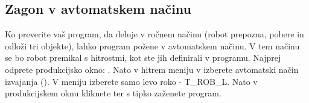 \subsection{Zagon v avtomatskem načinu}

Ko preverite vaš program, da deluje v ročnem načinu (robot prepozna, pobere  in odloži tri objekte), lahko program požene v avtomatskem načinu. V tem načinu se bo robot premikal s hitrostmi, kot ste jih definirali  v programu. Najprej odprete produkcijsko okno: . Nato v hitrem meniju v  izberete avtomatski način izvajanja (). V meniju  izberete samo levo roko - T\_ROB\_L. Nato v produkcijskem oknu  kliknete  ter s tipko  zaženete program.